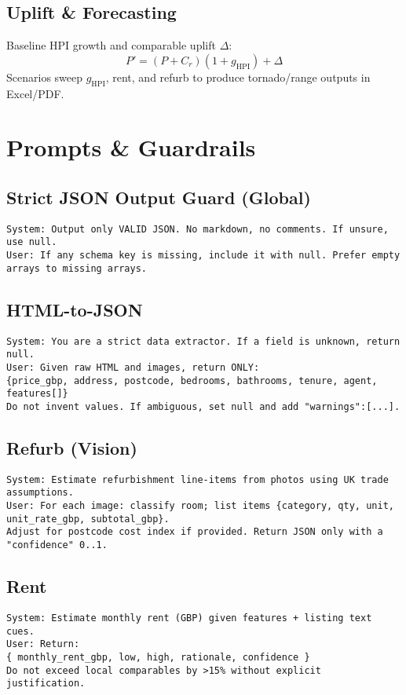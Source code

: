\documentclass[12pt,a4paper]{article}
\begin{document}
\subsection{Uplift \& Forecasting}
Baseline HPI growth and comparable uplift $\Delta$:
\[
P' = (P + C_r)(1 + g_{\text{HPI}}) + \Delta
\]
Scenarios sweep $g_{\text{HPI}}$, rent, and refurb to produce tornado/range outputs in Excel/PDF.

\section{Prompts \& Guardrails}
\subsection{Strict JSON Output Guard (Global)}
\begin{lstlisting}
System: Output only VALID JSON. No markdown, no comments. If unsure, use null.
User: If any schema key is missing, include it with null. Prefer empty arrays to missing arrays.
\end{lstlisting}

\subsection{HTML-to-JSON}
\begin{lstlisting}
System: You are a strict data extractor. If a field is unknown, return null.
User: Given raw HTML and images, return ONLY:
{price_gbp, address, postcode, bedrooms, bathrooms, tenure, agent, features[]}
Do not invent values. If ambiguous, set null and add "warnings":[...].
\end{lstlisting}

\subsection{Refurb (Vision)}
\begin{lstlisting}
System: Estimate refurbishment line-items from photos using UK trade assumptions.
User: For each image: classify room; list items {category, qty, unit, unit_rate_gbp, subtotal_gbp}.
Adjust for postcode cost index if provided. Return JSON only with a "confidence" 0..1.
\end{lstlisting}

\subsection{Rent}
\begin{lstlisting}
System: Estimate monthly rent (GBP) given features + listing text cues.
User: Return:
{ monthly_rent_gbp, low, high, rationale, confidence }
Do not exceed local comparables by >15% without explicit justification.
\end{lstlisting}
\end{document}
